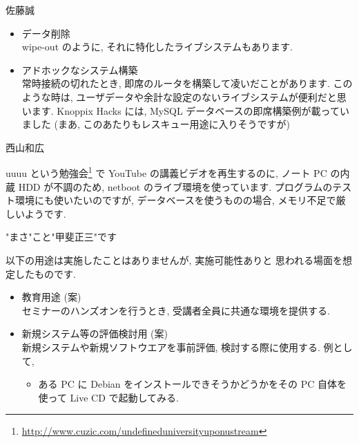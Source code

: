 \documentclass[mingoth,a4paper]{jsarticle}
\begin{document}
\begin{prework}{ 佐藤誠 }

    \begin{itemize}
          \item データ削除　\\
        wipe-out のように, それに特化したライブシステムもあります.
          \item アドホックなシステム構築　\\
常時接続の切れたとき, 即席のルータを構築して凌いだことがあります.
このような時は, ユーザデータや余計な設定のないライブシステムが便利だと思います.
Knoppix Hacks には, MySQL データベースの即席構築例が載っていました
(まあ, このあたりもレスキュー用途に入りそうですが)
    \end{itemize}

\end{prework}



\begin{prework}{ 西山和広 }

    uuuu という勉強会\footnote{\url{http://www.cuzic.com/undefineduniversityuponustream}}
    で YouTube の講義ビデオを再生するのに, ノート PC の内蔵 HDD が不調のため, netboot のライブ環境を使っています.
    プログラムのテスト環境にも使いたいのですが, データベースを使うものの場合, メモリ不足で厳しいようです.

\end{prework}



\begin{prework}{ "まさ"こと"甲斐正三"です }

以下の用途は実施したことはありませんが, 実施可能性ありと
思われる場面を想定したものです.
\begin{itemize}
      \item 教育用途 (案)　\\
    セミナーのハンズオンを行うとき, 受講者全員に共通な環境を提供する.
      \item 新規システム等の評価検討用 (案)　\\
    新規システムや新規ソフトウエアを事前評価,
    検討する際に使用する.
    例として,
    \begin{itemize}
          \item ある PC に Debian をインストールできそうかどうかをその PC 自体を使って Live CD で起動してみる.
    \end{itemize}
\end{itemize}

\end{prework}
\end{document}
